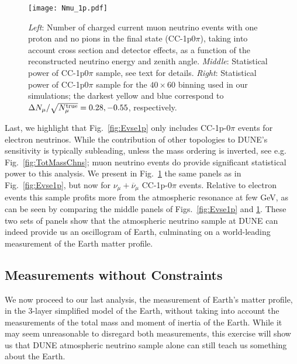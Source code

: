 \begin{figure}[t]
\begin{center}
\texttt{[image: Nmu\_1p.pdf]}
\caption{\emph{Left}: Number of charged current muon neutrino events with one proton and no pions in the final state (CC-1p0$\pi$), taking into account cross section and detector effects, as a function of the reconstructed neutrino energy and zenith angle. 
\emph{Middle}: Statistical power of CC-1p0$\pi$ sample, see text for details.
\emph{Right}: Statistical power of CC-1p0$\pi$ sample for the $40\times60$ binning used in our simulations; the darkest yellow and blue correspond to $\Delta N_\mu/\sqrt{N_\mu^{\rm true}}= 0.28, -0.55$, respectively.
\label{fig:Evsmu1p}} 
\end{center}
\end{figure}
Last, we highlight that Fig.~\ref{fig:Evse1p} only includes CC-1p-0$\pi$ events for electron neutrinos. 
While the contribution of other topologies to DUNE's sensitivity is typically subleading, unless the mass ordering is inverted, see e.g. Fig.~\ref{fig:TotMassChns}; muon neutrino events do provide significant statistical power to this analysis. 
We present in Fig.~\ref{fig:Evsmu1p} the same panels as in Fig.~\ref{fig:Evse1p}, but now for $\nu_\mu+\overline\nu_\mu$ CC-1p-0$\pi$ events.
Relative to electron events this sample profits more from the atmospheric resonance at few GeV, as can be seen by comparing the middle panels of Figs.~\ref{fig:Evse1p} and \ref{fig:Evsmu1p}.
These two sets of panels show that the atmospheric neutrino sample at DUNE can indeed provide us an oscillogram of Earth, culminating on a world-leading measurement of the Earth matter profile.




\subsection{Measurements without Constraints}
\label{subsec:MeasureRhos}
We now proceed to our last analysis, the measurement of Earth's matter profile, in the 3-layer simplified model of the Earth, without taking into account the measurements of the total mass and moment of inertia of the Earth.
While it may seem unreasonable to disregard both measurements, this exercise will show us that DUNE atmospheric neutrino sample alone can still teach us something about the Earth.

